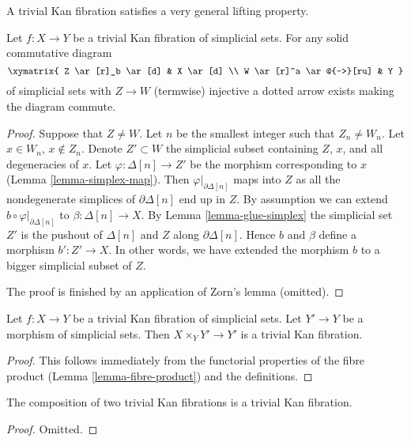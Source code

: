 \noindent
A trivial Kan fibration satisfies a very general lifting property.

\begin{lemma}
\label{lemma-trivial-kan}
Let $f : X \to Y$ be a trivial Kan fibration of simplicial sets.
For any solid commutative diagram
$$
\xymatrix{
Z \ar[r]_b \ar[d] & X \ar[d] \\
W \ar[r]^a \ar@{-->}[ru] & Y
}
$$
of simplicial sets with $Z \to W$ (termwise) injective
a dotted arrow exists making the diagram commute.
\end{lemma}

\begin{proof}
Suppose that $Z \not = W$. Let $n$ be the smallest integer such that
$Z_n \not = W_n$. Let $x \in W_n$, $x \not \in Z_n$. Denote
$Z' \subset W$ the simplicial subset containing $Z$, $x$, and
all degeneracies of $x$. Let
$\varphi : \Delta[n] \to Z'$ be the morphism corresponding to $x$
(Lemma \ref{lemma-simplex-map}).
Then $\varphi|_{\partial \Delta[n]}$ maps into $Z$
as all the nondegenerate simplices of $\partial \Delta[n]$ end up in $Z$.
By assumption we can extend $b \circ \varphi|_{\partial \Delta[n]}$
to $\beta : \Delta[n] \to X$.
By Lemma \ref{lemma-glue-simplex} the simplicial set $Z'$
is the pushout of $\Delta[n]$ and $Z$ along $\partial \Delta[n]$.
Hence $b$ and $\beta$ define a morphism $b' : Z' \to X$.
In other words, we have extended the morphism $b$ to a bigger
simplicial subset of $Z$.

\medskip\noindent
The proof is finished by an application of Zorn's lemma (omitted).
\end{proof}

\begin{lemma}
\label{lemma-trivial-kan-base-change}
Let $f : X \to Y$ be a trivial Kan fibration of simplicial sets.
Let $Y' \to Y$ be a morphism of simplicial sets.
Then $X \times_Y Y' \to Y'$ is a trivial Kan fibration.
\end{lemma}

\begin{proof}
This follows immediately from the functorial properties of the fibre
product (Lemma \ref{lemma-fibre-product}) and the definitions.
\end{proof}

\begin{lemma}
\label{lemma-trivial-kan-composition}
The composition of two trivial Kan fibrations is a trivial Kan fibration.
\end{lemma}

\begin{proof}
Omitted.
\end{proof}

